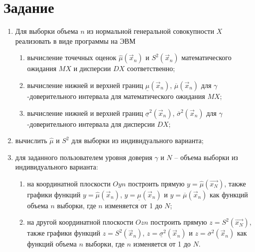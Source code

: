 \chapter{Задание}


\begin{enumerate}
	\item Для выборки объема $n$ из нормальной генеральной совокупности $X$ реализовать в виде программы на ЭВМ
	\begin{enumerate}
		\item вычисление точечных оценок $\hat\mu(\vec x_n)$ и $S^2(\vec x_n)$ математического ожидания $MX$ и дисперсии $DX$ соответственно;
		\item вычисление нижней и верхней границ $\underline\mu(\vec x_n)$, $\overline\mu(\vec x_n)$ для $\gamma$-доверительного интервала для математического ожидания $MX$;
		\item вычисление нижней и верхней границ $\underline\sigma^2(\vec x_n)$, $\overline\sigma^2(\vec x_n)$ для $\gamma$-доверительного интервала для дисперсии $DX$;
	\end{enumerate}
	\item вычислить $\hat\mu$ и $S^2$ для выборки из индивидуального варианта;
	\item для заданного пользователем уровня доверия $\gamma$ и $N$ – объема выборки из индивидуального варианта:
	\begin{enumerate}
		\item на координатной плоскости $Oyn$ построить прямую $y = \hat\mu(\vec{x_N})$, также графики функций $y = \hat\mu(\vec x_n)$, $y = \underline\mu(\vec x_n)$ и $y = \overline\mu(\vec x_n)$ как функций объема $n$ выборки, где $n$ изменяется от 1 до $N$;
		\item на другой координатной плоскости $Ozn$ построить прямую $z = S^2(\vec{x_N})$, также графики функций $z = S^2(\vec x_n)$, $z = \underline\sigma^2(\vec x_n)$ и $z = \overline\sigma^2(\vec x_n)$ как функций объема $n$ выборки, где $n$ изменяется от 1 до $N$.
	\end{enumerate}
\end{enumerate}






